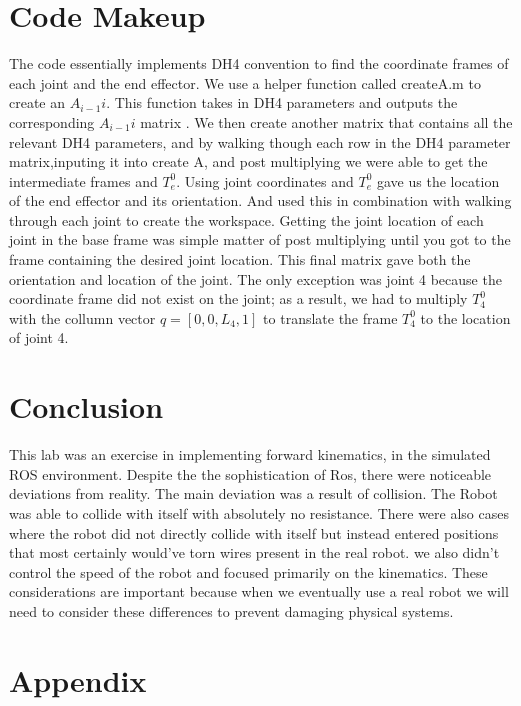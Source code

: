 \documentclass[12pt]{article}
\begin{document}
\section{Code Makeup}
\par{ The code essentially implements DH4 convention to find the coordinate frames of each joint and the end effector. We use a helper function called createA.m to create an $A_{i-1}{i}$. This function takes in DH4 parameters and outputs the corresponding $A_{i-1}{i}$ matrix . We then create another matrix that contains all the relevant DH4 parameters, and by walking though each row in the DH4 parameter matrix,inputing it into create A, and post multiplying we were able to get the intermediate frames and $T^{0}_{e}$. Using joint coordinates and $T^{0}_{e}$ gave us the location of the end effector and its orientation. And used this in combination with walking through each joint to create the workspace. Getting the joint location of each joint in the base frame was simple matter of post multiplying until you got to the frame containing the desired joint location. This final matrix gave both the orientation and location of the joint. The only exception was joint 4 because the coordinate frame did not exist on the joint; as a result, we had to multiply $T^{0}_{4}$ with the collumn vector $q=[0,0,L_{4},1]$ to translate the frame $T^{0}_{4}$  to the location of joint 4.
}

\section{Conclusion}
\par{This lab was an exercise in implementing forward kinematics, in the simulated ROS environment. Despite the the sophistication of Ros, there were noticeable deviations from reality. The main deviation was a result of collision. The Robot was able to collide with itself with absolutely no resistance. There were also cases where the robot did not directly collide with itself but instead entered positions that most certainly would've torn wires present in the real robot. we also didn't control the speed of the robot and focused primarily on the kinematics. These considerations are important because when we eventually use a real robot we will need to consider these differences to prevent damaging physical systems.
}
\section{Appendix}
%
	
%
	
%
\end{document}
